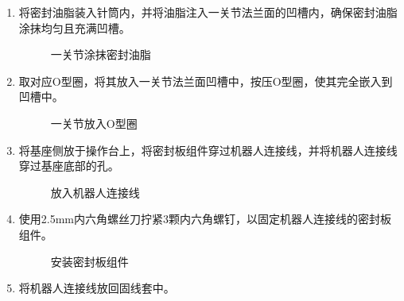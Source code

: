 \documentclass[a4paper,11pt,english,openany,oneside]{sphinxmanual}
\begin{document}
\sphinxAtStartPar
{}
\begin{enumerate}
%
\item {} 
\sphinxAtStartPar
将密封油脂装入针筒内，并将油脂注入一关节法兰面的凹槽内，确保密封油脂涂抹均匀且充满凹槽。

\begin{figure}[H]
\centering
\capstart

\noindent{}
\caption{一关节涂抹密封油脂}\label{\detokenize{_u66f4_u6362_u57fa_u5ea7:id18}}\end{figure}

\item {} 
\sphinxAtStartPar
取对应O型圈，将其放入一关节法兰面凹槽中，按压O型圈，使其完全嵌入到凹槽中。

\begin{figure}[H]
\centering
\capstart

\noindent{}
\caption{一关节放入O型圈}\label{\detokenize{_u66f4_u6362_u57fa_u5ea7:id19}}\end{figure}

\item {} 
\sphinxAtStartPar
将基座侧放于操作台上，将密封板组件穿过机器人连接线，并将机器人连接线穿过基座底部的孔。

\begin{figure}[H]
\centering
\capstart

\noindent{}
\caption{放入机器人连接线}\label{\detokenize{_u66f4_u6362_u57fa_u5ea7:id20}}\end{figure}

\item {} 
\sphinxAtStartPar
使用2.5mm内六角螺丝刀拧紧3颗内六角螺钉，以固定机器人连接线的密封板组件。

\begin{figure}[H]
\centering
\capstart

\noindent{}
\caption{安装密封板组件}\label{\detokenize{_u66f4_u6362_u57fa_u5ea7:id21}}\end{figure}

\item {} 
\sphinxAtStartPar
将机器人连接线放回固线套中。

\begin{figure}[H]
\centering
\capstart


\end{figure}
\end{enumerate}
\end{document}
